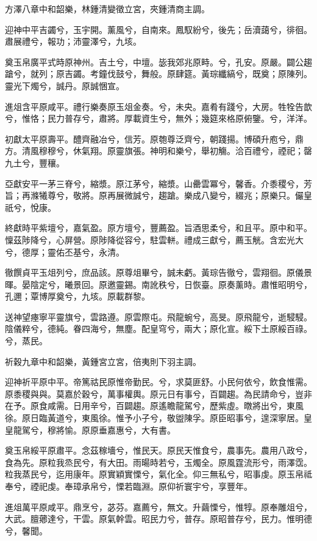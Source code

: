 \begin{pinyinscope}
方澤八章中和韶樂，林鍾清變徵立宮，夾鍾清商主調。

迎神中平吉蠲兮，玉宇開。薰風兮，自南來。鳳馭紛兮，後先；岳瀆藹兮，徘徊。肅展禮兮，報功；沛靈澤兮，九垓。

奠玉帛廣平式時原神州。吉土兮，中壇。毖我郊兆原畤。兮，孔安。原嚴。闢公趨蹌兮，就列；原吉蠲。考鐘伐鼓兮，舞般。原肆筵。黃琮纖縞兮，既奠；原陳列。靈光下燭兮，誠丹。原誠悃宣。

進俎含平原咸平。禮行樂奏原玉俎金奏。兮，未央。嘉肴有踐兮，大房。牲牷告歆兮，惟恪；民力普存兮，肅將。厚載資生兮，無外；幾筵來格原俯鑒。兮，洋洋。

初獻太平原壽平。醴齊融冶兮，信芳。原匏尊泛齊兮，朝踐揚。博碩升庖兮，鼎方。清風穆穆兮，休氣翔。原靈旗張。神明和樂兮，舉初觴。洽百禮兮，禋祀；罄九土兮，豐穰。

亞獻安平一茅三脊兮，縮漿。原江茅兮，縮漿。山罍雲冪兮，馨香。介黍稷兮，芳旨；再滌犧尊兮，敬將。原再展微誠兮，趨蹌。樂成八變兮，綴兆；原樂只。儼皇祇兮，悅康。

終獻時平紫壇兮，嘉氣盈。原方壇兮，豐薦盈。旨酒思柔兮，和且平。原中和平。懍茲陟降兮，心屏營。原陟降從容兮，駐雲軿。禮成三獻兮，薦玉觥。含宏光大兮，德厚；靈佑丕基兮，永清。

徹饌貞平玉俎列兮，庶品該。原尊俎畢兮，誠未虧。黃琮告徹兮，雲翔徊。原儀景暉。晏陰定兮，曦景回。原邀靈錫。南訛秩兮，日恢臺。原奏薰時。肅惟昭明兮，孔邇；覃博厚奠兮，九垓。原載群黎。

送神望瘞寧平靈旗兮，雲路遵。原雲際屯。飛龍蜿兮，高旻。原飛龍兮，逝駸駸。陰儀粹兮，德純。眷四海兮，無塵。配皇穹兮，兩大；原化宣。綏下土原綏百祿。兮，蒸民。

祈穀九章中和韶樂，黃鍾宮立宮，倍夷則下羽主調。

迎神祈平原中平。帝篤祜民原惟帝勤民。兮，求莫匪舒。小民何依兮，飲食惟需。原黍稷與與。莫嘉於穀兮，萬事權輿。原元日有事兮，百闢趨。為民請命兮，豈非在予。原食咸需。日用辛兮，百闢趨。原遙瞻龍駕兮，歷紫虛。暾將出兮，東風徐。原日臨黃道兮，東風徐。惟予小子兮，敬盥陳孚。原臣昭事兮，遑深寧居。皇皇龍駕兮，穆將愉。原原垂嘉惠兮，大有書。

奠玉帛綏平原肅平。念茲稼墻兮，惟民天。原民天惟食兮，農事先。農用八政兮，食為先。原粒我烝民兮，有大田。雨暘時若兮，玉燭全。原風霆流形兮，雨澤霑。粒我蒸民兮，迄用康年。原實穎實慄兮，氣化全。仰三無私兮，昭事虔。原玉帛祗奉兮，禋祀虔。奉璋承帛兮，慄若臨淵。原仰祈寰宇兮，享豐年。

進俎萬平原咸平。鼎烹兮，苾芬。嘉薦兮，無文。升繭慄兮，惟犉。原奉雕俎兮，大武。膻薌達兮，干雲。原氣幹雲。昭民力兮，普存。原昭普存兮，民力。惟明德兮，馨聞。


\end{pinyinscope}
